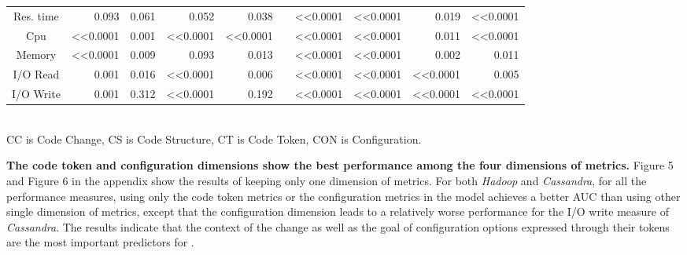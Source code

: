 \begin{table*}
\begin{tabular}{|c|r|r|r|r|r|r|r|r|r|}
    Res. time & 0.093    & 0.061    & 0.052  & 0.038     &                       & \textless{}\textless{}0.0001   & \textless{}\textless{}0.0001  & 0.019& \textless{}\textless{}0.0001   \\ \cline{1-5} \cline{7-10} 
    Cpu       & \textless{}\textless{}0.0001      & 0.001    & \textless{}\textless{}0.0001    & \textless{}\textless{}0.0001       &                       & \textless{}\textless{}0.0001   & \textless{}\textless{}0.0001  & 0.011& \textless{}\textless{}0.0001   \\ \cline{1-5} \cline{7-10} 
    Memory    & \textless{}\textless{}0.0001      & 0.009    & 0.093  & 0.013     &                       & \textless{}\textless{}0.0001   & \textless{}\textless{}0.0001  & 0.002& 0.011 \\ \cline{1-5} \cline{7-10} 
    I/O Read  & 0.001    & 0.016    & \textless{}\textless{}0.0001    & 0.006     &                       & \textless{}\textless{}0.0001   & \textless{}\textless{}0.0001  & \textless{}\textless{}0.0001  & 0.005 \\ \cline{1-5} \cline{7-10} 
    I/O Write & 0.001    & 0.312    & \textless{}\textless{}0.0001    & 0.192     &                       & \textless{}\textless{}0.0001   & \textless{}\textless{}0.0001  & \textless{}\textless{}0.0001  & \textless{}\textless{}0.0001   \\ \cline{1-5} \cline{7-10} \hline
    \end{tabular}
\label{tab:difference}\\
\vspace{0.1cm}
\footnotesize{CC is Code Change, CS is Code Structure, CT is Code Token, CON is Configuration.}
\end{table*}

\textbf{The code token and configuration dimensions show the best performance among the four dimensions of metrics.} Figure 5 and Figure 6 in the appendix %
show the results of keeping only one dimension of metrics. For both \emph{Hadoop} and \emph{Cassandra}, for all the performance measures, using only the code token metrics or the configuration metrics in the model achieves a better AUC than using other single dimension of metrics, except that the configuration dimension leads to a relatively worse performance for the I/O write measure of \emph{Cassandra}.
The results indicate that the context of the change as well as the goal of configuration options expressed through their tokens are the most important predictors for \inconsistent. %

